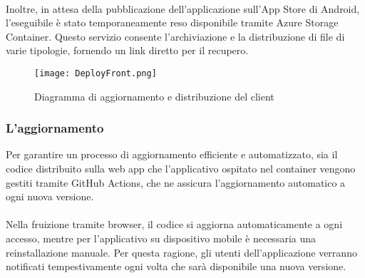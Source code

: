 \\
Inoltre, in attesa della pubblicazione dell’applicazione sull’App Store di Android, l’eseguibile è stato temporaneamente reso disponibile tramite Azure Storage Container.
Questo servizio consente l’archiviazione e la distribuzione di file di varie tipologie, fornendo un link diretto per il recupero.
\clearpage
\begin{figure}[h!]
    \begin{center}
        \texttt{[image: DeployFront.png]}
        \caption{Diagramma di aggiornamento e distribuzione del client}
    \end{center}
\end{figure}

\subsubsection{L'aggiornamento}
Per garantire un processo di aggiornamento efficiente e automatizzato,
sia il codice distribuito sulla web app che l’applicativo ospitato nel container vengono gestiti tramite GitHub Actions,
che ne assicura l’aggiornamento automatico a ogni nuova versione. \\
\\

Nella fruizione tramite browser, il codice si aggiorna automaticamente a ogni accesso, mentre per l’applicativo su dispositivo mobile è necessaria una reinstallazione manuale.
Per questa ragione, gli utenti dell’applicazione verranno notificati tempestivamente ogni volta che sarà disponibile una nuova versione.
\clearpage
